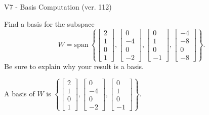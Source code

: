 \begin{exercise}
  \begin{exerciseTitle}V7 - Basis Computation (ver. 112)\end{exerciseTitle}
  \begin{exerciseStatement}
    Find a basis for the subspace 
\[W=\mathrm{span}\ \left\{\left[\begin{array}{r}
2 \\
1 \\
0 \\
1
\end{array}\right] , \left[\begin{array}{r}
0 \\
-4 \\
0 \\
-2
\end{array}\right] , \left[\begin{array}{r}
0 \\
1 \\
0 \\
-1
\end{array}\right] , \left[\begin{array}{r}
-4 \\
-8 \\
0 \\
-8
\end{array}\right]\right\}.\]
 Be sure to explain why your result is a basis.


  \end{exerciseStatement}
  \begin{exerciseAnswer}
   A basis of \(W\) is  \(\left\{\left[\begin{array}{r}
2 \\
1 \\
0 \\
1
\end{array}\right] , \left[\begin{array}{r}
0 \\
-4 \\
0 \\
-2
\end{array}\right] , \left[\begin{array}{r}
0 \\
1 \\
0 \\
-1
\end{array}\right]\right\}\).
  


  \end{exerciseAnswer}
\end{exercise}